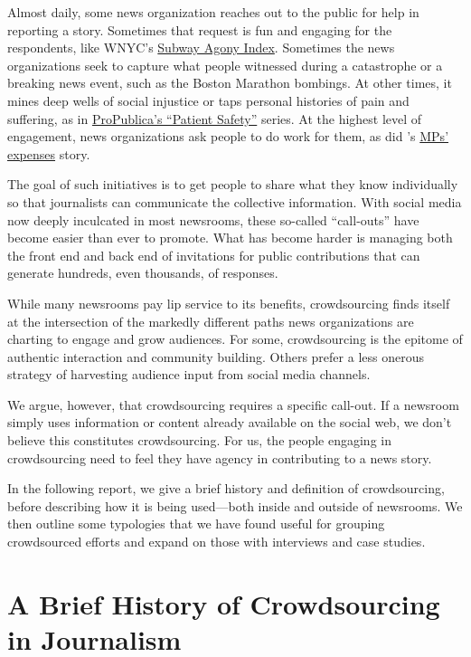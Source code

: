 \begin{itemize}
Almost daily, some news organization reaches out to the public for help in reporting a story. Sometimes that request is fun and engaging for the respondents, like WNYC’s \href{http://www.wnyc.org/story/your-subway-agony/}{Subway Agony Index}.\autocite{SubwayAgony} Sometimes the news organizations seek to capture what people witnessed during a catastrophe or a breaking news event, such as the Boston Marathon bombings. At other times, it mines deep wells of social injustice or taps personal histories of pain and suffering, as in \href{https://www.propublica.org/series/patient-safety}{ProPublica’s ``Patient Safety''} series.\autocite{Safety} At the highest level of engagement, news organizations ask people to do work for them, as did ’s \href{http://www.theguardian.com/politics/mps-expenses}{MPs’ expenses} story.\autocite{MPExpense}

The goal of such initiatives is to get people to share what they know individually so that journalists can communicate the collective information. With social media now deeply inculcated in most newsrooms, these so-called ``call-outs'' have become easier than ever to promote. What has become harder is managing both the front end and back end of invitations for public contributions that can generate hundreds, even thousands, of responses.

While many newsrooms pay lip service to its benefits, crowdsourcing finds itself at the intersection of the markedly different paths news organizations are charting to engage and grow audiences. For some, crowdsourcing is the epitome of authentic interaction and community building. Others prefer a less onerous strategy of harvesting audience input from social media channels.

We argue, however, that crowdsourcing requires a specific call-out. If a newsroom simply uses information or content already available on the social web, we don’t believe this constitutes crowdsourcing. For us, the people engaging in crowdsourcing need to feel they have agency in contributing to a news story.

In the following report, we give a brief history and definition of crowdsourcing, before describing how it is being used---both inside and outside of newsrooms. We then outline some typologies that we have found useful for grouping crowdsourced efforts and expand on those with interviews and case studies. 


\chapter{A Brief History of Crowdsourcing in Journalism}



\end{itemize}
